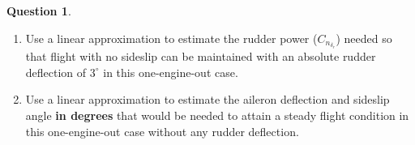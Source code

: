 \documentclass{article}
\theoremstyle{definition}
\newtheorem{question}{Question}
\begin{document}
\begin{question}
\begin{enumerate}[label=\alph*)]
    \item Use a linear approximation to estimate the rudder power ($C_{n_{\delta_r}}$) needed so that flight with no sideslip can be maintained with an absolute rudder deflection of $3^\circ$ in this one-engine-out case.

    \item Use a linear approximation to estimate the aileron deflection and sideslip angle \textbf{in degrees} that would be needed to attain a steady flight condition in this one-engine-out case without any rudder deflection.

    
\end{enumerate}
\end{question}

\vspace{0.1cm}
\clearpage
\end{document}
